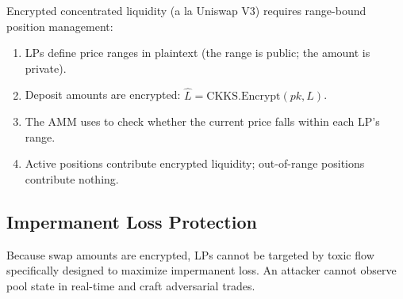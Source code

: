 Encrypted concentrated liquidity (a la Uniswap V3) requires range-bound position management:

\begin{enumerate}
    \item LPs define price ranges in plaintext (the range is public; the amount is private).
    \item Deposit amounts are encrypted: $\hat{L} = \text{CKKS.Encrypt}(pk, L)$.
    \item The AMM uses \TFHE{} to check whether the current price falls within each LP's range.
    \item Active positions contribute encrypted liquidity; out-of-range positions contribute nothing.
\end{enumerate}

\subsection{Impermanent Loss Protection}

Because swap amounts are encrypted, LPs cannot be targeted by toxic flow specifically designed to maximize impermanent loss. An attacker cannot observe pool state in real-time and craft adversarial trades.

